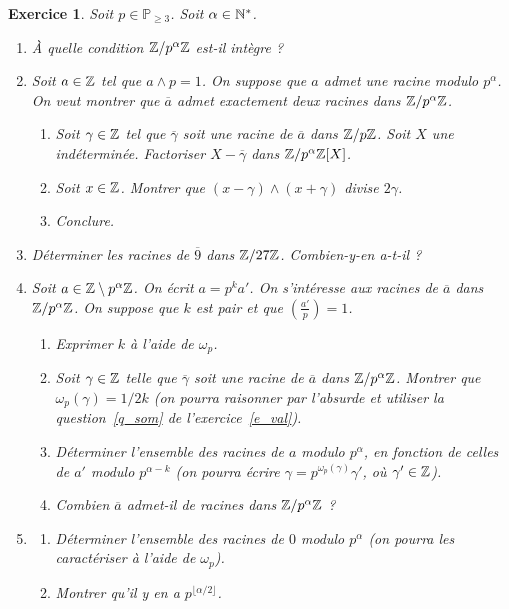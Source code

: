 \documentclass[11pt,a4paper]{article}
\newtheorem{ex}{Exercice}
\begin{document}
\begin{ex}\label{exNombres_racines}
Soit $p\in \mathbb{P}_{\geq 3}$.  Soit $\alpha\in \mathbb{N}^*$.

\begin{enumerate}

\item À quelle condition $\mathbb{Z}/p^\alpha\mathbb{Z}$ est-il intègre ?


\item Soit $a\in \mathbb{Z}$ tel que $a\wedge p=1$. On suppose que $a$ admet une racine modulo $p^\alpha$.  On veut montrer que $\overline{a}$ admet exactement deux racines dans $\mathbb{Z}/p^\alpha\mathbb{Z}$. \begin{enumerate}
\item Soit $\gamma\in \mathbb{Z}$ tel que $\overline{\gamma}$ soit une racine de $\overline{a}$ dans $\mathbb{Z}/p\mathbb{Z}$. Soit $X$ une indéterminée. Factoriser $X-\overline{\gamma}$ dans $\mathbb{Z}/p^\alpha\mathbb{Z} [X]$. 

\item Soit $x\in \mathbb{Z}$. Montrer que $(x-\gamma)\wedge (x+\gamma)$ divise $2\gamma$. 

\item Conclure.
\end{enumerate}

\item Déterminer les racines de $\overline{9}$ dans $\mathbb{Z}/27\mathbb{Z}$. Combien-y-en a-t-il ?

\item Soit $a\in \mathbb{Z}\setminus p^\alpha \mathbb{Z}$. On écrit $a=p^k a'$. On s'intéresse aux racines de $\overline{a}$ dans $\mathbb{Z}/p^\alpha\mathbb{Z}$.  On suppose que $k$ est pair et que $\left(\frac{a'}{p}\right)=1$. \begin{enumerate}
\item Exprimer $k$ à l'aide de $\omega_p$. 

\item Soit $\gamma\in \mathbb{Z}$ telle que $\overline{\gamma}$ soit une racine de $\overline{a}$ dans $\mathbb{Z}/p^\alpha\mathbb{Z}$. Montrer que $\omega_p(\gamma)=1/2k$ (on pourra raisonner par l'absurde et utiliser la question~\ref{q_som} de l'exercice~\ref{e_val}).

\item Déterminer l'ensemble des racines de $a$ modulo $p^\alpha$, en fonction de celles de $a'$ modulo $p^{\alpha-k}$ (on pourra écrire $\gamma=p^{\omega_p(\gamma)}\gamma'$, où $\gamma'\in \mathbb{Z}$).

\item Combien $\overline{a}$ admet-il de racines dans $\mathbb{Z}/p^\alpha \mathbb{Z}$ ?
\end{enumerate}  
\item \begin{enumerate}
\item Déterminer l'ensemble des racines de $0$ modulo $p^\alpha$ (on pourra les caractériser à l'aide de $\omega_p$).

\item Montrer qu'il y en a $p^{\lfloor \alpha/2\rfloor}$.
\end{enumerate} 
\end{enumerate}
\end{ex}
\end{document}
